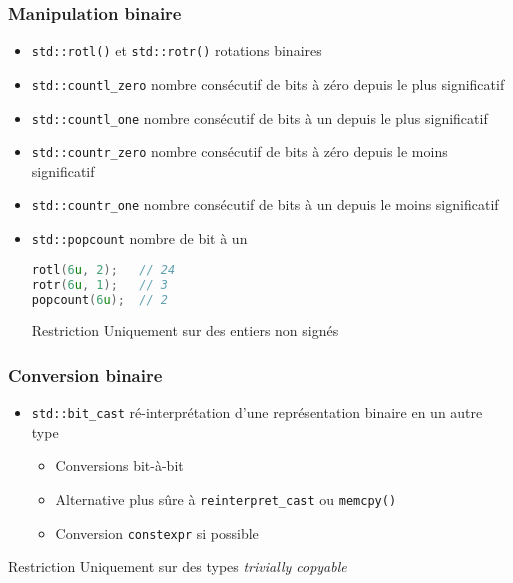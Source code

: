 \documentclass[C++.tex]{subfiles}
\begin{document}
\begin{frame}[fragile]
	\frametitle{Manipulation binaire}
	\begin{itemize}
		\item \lstinline|std::rotl()| et \lstinline|std::rotr()| rotations binaires


		\item \lstinline|std::countl_zero| nombre consécutif de bits à zéro depuis le plus significatif
		\item \lstinline|std::countl_one| nombre consécutif de bits à un depuis le plus significatif
		\item \lstinline|std::countr_zero| nombre consécutif de bits à zéro depuis le moins significatif
		\item \lstinline|std::countr_one| nombre consécutif de bits à un depuis le moins significatif
		\item \lstinline|std::popcount| nombre de bit à un

		\begin{lstlisting}[language=C++]
rotl(6u, 2);   // 24
rotr(6u, 1);   // 3
popcount(6u);  // 2\end{lstlisting}

		\begin{alertblock}{Restriction}
			Uniquement sur des entiers non signés
		\end{alertblock}
	\end{itemize}
\end{frame}

\begin{frame}[fragile]
	\frametitle{Conversion binaire}
	\begin{itemize}
		\item \lstinline|std::bit_cast| ré-interprétation d'une représentation binaire en un autre type
		\begin{itemize}
			\item Conversions bit-à-bit
			\item Alternative plus sûre à \lstinline|reinterpret_cast| ou \lstinline|memcpy()|
			\item Conversion \lstinline|constexpr| si possible
		\end{itemize}
	\end{itemize}

	\begin{alertblock}{Restriction}
		Uniquement sur des types \textit{trivially copyable}
	\end{alertblock}
\end{frame}
\end{document}
